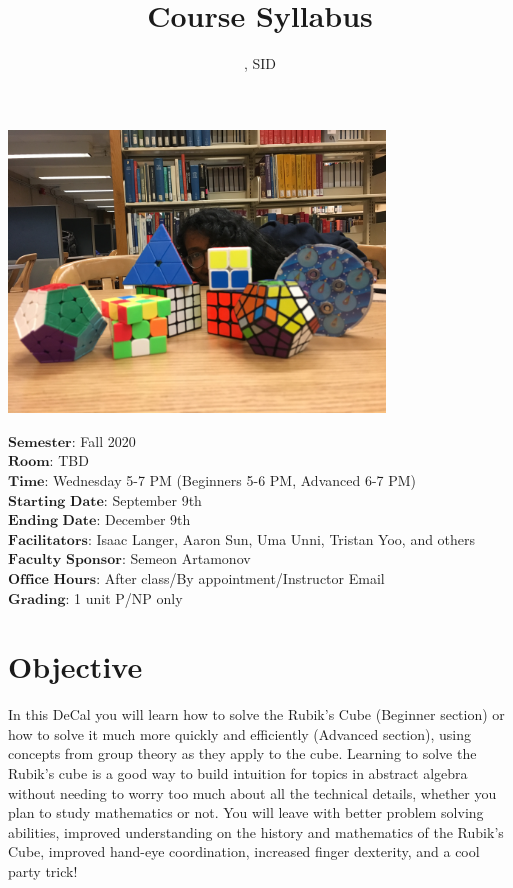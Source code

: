 \documentclass[11pt]{article}
\author{\Name, SID \SID}
\date{}
\begin{document}
\maketitle
\title{Course Syllabus}
\centerline{\includegraphics[width=10cm]{5.JPG}}

$\textbf{Semester}$: Fall 2020\\
$\textbf{Room}$: TBD\\
$\textbf{Time}$: Wednesday 5-7 PM (Beginners 5-6 PM, Advanced 6-7 PM)\\
$\textbf{Starting Date}$: September 9th\\
$\textbf{Ending Date}$: December 9th\\
$\textbf{Facilitators}$: Isaac Langer, Aaron Sun, Uma Unni, Tristan Yoo, and others\\
$\textbf{Faculty Sponsor}$: Semeon Artamonov\\
$\textbf{Office Hours}$: After class/By appointment/Instructor Email \\
$\textbf{Grading}$: 1 unit P/NP only

\section*{Objective}
In this DeCal you will learn how to solve the Rubik’s Cube (Beginner section) or how to solve it much more quickly and efficiently (Advanced section), using concepts from group theory as they apply to the cube. Learning to solve the Rubik's cube is a good way to build intuition for topics in abstract algebra without needing to worry too much about all the technical details, whether you plan to study mathematics or not. You will leave with better problem solving abilities, improved understanding on the history and mathematics of the Rubik’s Cube, improved hand-eye coordination, increased finger dexterity, and a cool party trick!
\end{document}
